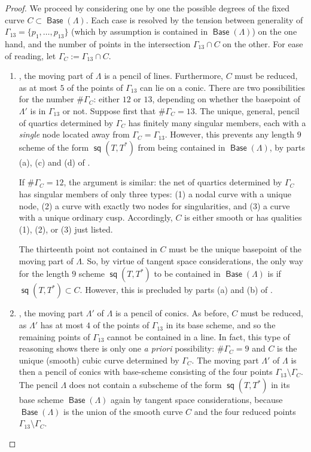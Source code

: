 \documentclass{article}
\DeclareMathOperator{\s}{\mathsf{sq}}
\DeclareMathOperator{\Base}{\mathsf{Base}}
\begin{document}
\begin{proof}
  We proceed by considering one by one the possible degrees of the
  fixed curve $C \subset \Base(\Lambda)$. Each case is resolved by the tension between 
  generality of $\Gamma_{13} = \{p_1, \dots, p_{13}\}$ (which by assumption is contained in $\Base(\Lambda)$) on the one hand, and the number of points in the intersection $\Gamma_{13} \cap C$ on the other. For ease of reading, let $\Gamma_{C} := \Gamma_{13} \cap C$.


\begin{enumerate}
  \item {},  the moving part of $\Lambda$ is a pencil of
  lines. Furthermore, $C$ must be reduced, as at most $5$ of the
  points of $\Gamma_{13}$ can lie on a conic. There are
  two possibilities for the number $\# \Gamma_{C}$: either $12$ or $13$, depending on whether the basepoint of $\Lambda'$ is in $\Gamma_{13}$ or not. Suppose first that $\# \Gamma_{C} = 13$. The unique, general, pencil of quartics
  determined by $\Gamma_{C}$ has finitely many singular members, each
  with a {\sl single} node located away from
  $\Gamma_{C} = \Gamma_{13}$. However, this prevents any length $9$
  scheme of the form $\s(T,T^{*})$ from being contained in $\Base(\Lambda)$, by parts (a), (c) and (d) of .  
  
  If
  $\# \Gamma_{C} = 12$, the argument is similar: the net of quartics
  determined by $\Gamma_{C}$ has singular members of only three types:
  (1) a nodal curve with a unique node, (2) a curve with exactly two
  nodes for singularities, and (3) a curve with a unique ordinary cusp.  Accordingly, $C$ is either smooth or has qualities (1), (2), or (3) just listed.  
  
  The thirteenth point not contained in $C$ must be the unique 
  basepoint of the moving part of $\Lambda$. So, by virtue of tangent space considerations, the only way
  for the length $9$ scheme $\s(T,T^{*})$ to be contained in
  $\Base(\Lambda)$ is if $\s(T,T^{*}) \subset C$. However, this is precluded by parts (a) and (b) of .

  \item {}, the moving part $\Lambda'$ of $\Lambda$ is a pencil of
  conics. As before, $C$ must be reduced, as $\Lambda'$ has at
  most $4$ of the points of $\Gamma_{13}$ in its base scheme, and so  the remaining points of $\Gamma_{13}$ cannot be contained in a line.
  In fact, this type of reasoning shows there is only one {\sl a priori}
  possibility: $\# \Gamma_{C} = 9$ and $C$ is the unique (smooth)
  cubic curve determined by $\Gamma_{C}$. The moving part $\Lambda'$ of $\Lambda$ is then a
  pencil of conics with base-scheme consisting of the four points 
  $\Gamma_{13} \setminus \Gamma_{C}$. The pencil $\Lambda$ 
  does not contain a subscheme of the form $\s(T,T^{*})$ in its base
  scheme $\Base(\Lambda)$ again by tangent space considerations, because $\Base(\Lambda)$ is the union of the smooth curve $C$ and the four reduced points $\Gamma_{13} \setminus \Gamma_{C}$.


\end{enumerate}
\end{proof}
\end{document}
